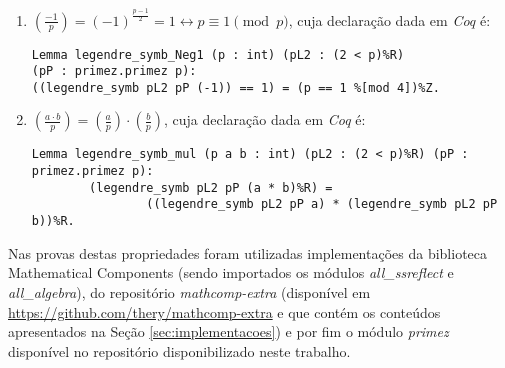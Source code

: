 \begin{enumerate}
        \item $\left(\frac{-1}{p}\right) = (-1)^{\frac{p - 1}{2}} = 1 \leftrightarrow p \equiv 1 \pmod{p}$, cuja declaração dada em \textit{Coq} é:
        \newline
                \begin{lstlisting}[language=coq,frame=single,tabsize=1]
Lemma legendre_symb_Neg1 (p : int) (pL2 : (2 < p)%R) 
(pP : primez.primez p):
((legendre_symb pL2 pP (-1)) == 1) = (p == 1 %[mod 4])%Z.
                \end{lstlisting}
        

        
        \item $\left(\frac{a \cdot b}{p}\right) = \left(\frac{a}{p}\right) \cdot \left(\frac{b}{p}\right)$, cuja declaração dada em \textit{Coq} é:
        \newline
                \begin{lstlisting}[language=coq,frame=single,tabsize=1]
Lemma legendre_symb_mul (p a b : int) (pL2 : (2 < p)%R) (pP : primez.primez p):
        (legendre_symb pL2 pP (a * b)%R) = 
                ((legendre_symb pL2 pP a) * (legendre_symb pL2 pP b))%R.
                \end{lstlisting}
        \end{enumerate}

        Nas provas destas propriedades foram utilizadas implementações da biblioteca Mathematical Components (sendo importados os módulos \textit{all\_ssreflect} e \textit{all\_algebra}), do repositório \textit{mathcomp-extra} (disponível em \url{https://github.com/thery/mathcomp-extra} e que contém os conteúdos apresentados na Seção \ref{sec:implementacoes}) e por fim o módulo \textit{primez} disponível no repositório disponibilizado neste trabalho.

